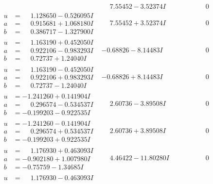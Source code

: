 \documentclass[1p]{elsarticle_modified}
\theoremstyle{definition}
\begin{document}
$$\begin{array}{c|c|c}
 & \phantom{-}7.55452 - 3.52374 I & \phantom{-0.000000 } 0 \\ \hline\begin{aligned}
u &= \phantom{-}1.128650 - 0.526095 I \\
a &= \phantom{-}0.915681 + 1.068180 I \\
b &= \phantom{-}0.386717 - 1.327900 I\end{aligned}
 & \phantom{-}7.55452 + 3.52374 I & \phantom{-0.000000 } 0 \\ \hline\begin{aligned}
u &= \phantom{-}1.163190 + 0.452050 I \\
a &= \phantom{-}0.922106 - 0.983293 I \\
b &= \phantom{-}0.72737 + 1.24040 I\end{aligned}
 & -0.68826 - 8.14483 I & \phantom{-0.000000 } 0 \\ \hline\begin{aligned}
u &= \phantom{-}1.163190 - 0.452050 I \\
a &= \phantom{-}0.922106 + 0.983293 I \\
b &= \phantom{-}0.72737 - 1.24040 I\end{aligned}
 & -0.68826 + 8.14483 I & \phantom{-0.000000 } 0 \\ \hline\begin{aligned}
u &= -1.241260 + 0.141904 I \\
a &= \phantom{-}0.296574 - 0.534537 I \\
b &= -0.199203 - 0.922535 I\end{aligned}
 & \phantom{-}2.60736 - 3.89508 I & \phantom{-0.000000 } 0 \\ \hline\begin{aligned}
u &= -1.241260 - 0.141904 I \\
a &= \phantom{-}0.296574 + 0.534537 I \\
b &= -0.199203 + 0.922535 I\end{aligned}
 & \phantom{-}2.60736 + 3.89508 I & \phantom{-0.000000 } 0 \\ \hline\begin{aligned}
u &= \phantom{-}1.176930 + 0.463093 I \\
a &= -0.902180 + 1.007980 I \\
b &= -0.75759 - 1.34685 I\end{aligned}
 & \phantom{-}4.46422 - 11.80280 I & \phantom{-0.000000 } 0 \\ \hline\begin{aligned}
u &= \phantom{-}1.176930 - 0.463093 I \\

\end{aligned}
\end{array}$$
\end{document}
